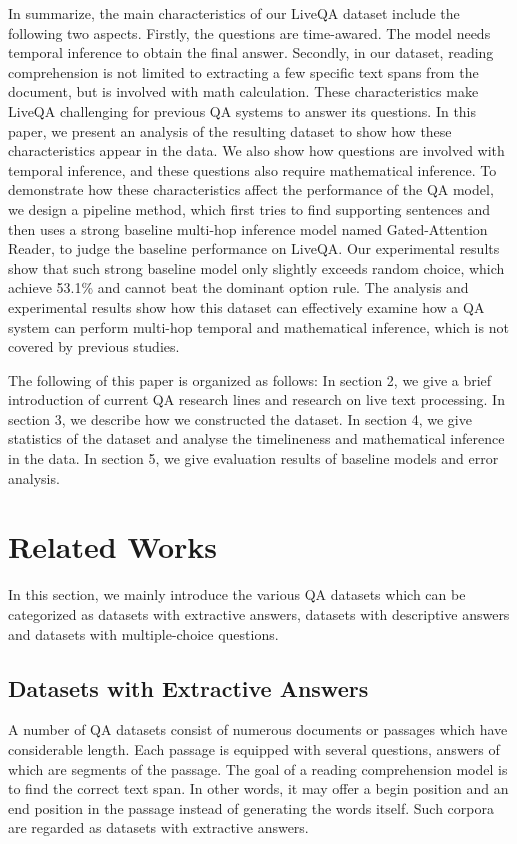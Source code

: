 In summarize, the main characteristics of our LiveQA dataset include the following two aspects.
Firstly,  the questions are time-awared. The model needs temporal inference to obtain the final answer.
Secondly, in our dataset, reading comprehension is not limited to extracting a few specific text spans from the document,
but is involved with math calculation.
These characteristics make LiveQA challenging for previous QA systems to answer its questions. 
In this paper, we present an analysis of the resulting dataset to show how these characteristics appear in the data. We also show how questions are involved with temporal inference, and these questions also require mathematical inference. To demonstrate how these characteristics affect the performance of the QA model, we design a pipeline method, which first tries to find supporting sentences and then uses a strong baseline multi-hop inference model named Gated-Attention Reader, to judge the baseline performance on LiveQA. Our experimental results show that 
such strong baseline model only slightly exceeds random choice, which achieve 53.1\% and cannot beat the dominant option rule. 
The analysis and experimental results show how this dataset can effectively examine how a QA system can perform multi-hop temporal and mathematical inference, which is not covered by previous studies.

The following of this paper is organized as follows: In section 2, we give a brief introduction of current QA research lines and research on live text processing. In section 3, we describe how we constructed the dataset. In section 4, we give statistics of the dataset and analyse the timelineness and mathematical inference in the data. In section 5, we give evaluation results of baseline models and error analysis.

\section{Related Works}
In this section, we mainly introduce the various QA datasets which can be categorized as datasets with extractive answers, datasets with descriptive answers and datasets with multiple-choice questions.

\subsection{Datasets with Extractive Answers}
A number of QA datasets consist of numerous documents or passages which have considerable length. Each passage is equipped with several questions, answers of which are segments of the passage. The goal of a reading comprehension model is to find the correct text span. In other words, it may offer a begin position and an end position in the passage instead of generating the words itself. Such corpora are regarded as datasets with extractive answers.

